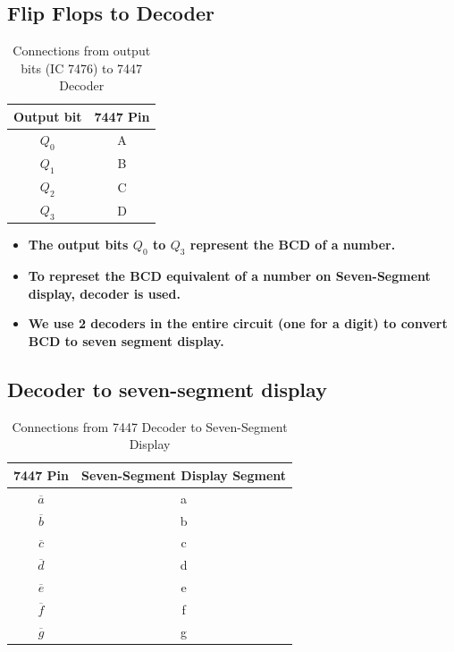 \documentclass[a4paper,12pt]{article}
\begin{document}
\subsection{Flip Flops to Decoder}
\begin{table}[H]
    \centering
    \renewcommand{\arraystretch}{1.3}
    \begin{tabular}{|c|c|}
        \hline
        \textbf{Output bit} & \textbf{7447 Pin} \\
        \hline
        $Q_0$ & A \\
        $Q_1$ & B \\
        $Q_2$ & C \\
        $Q_3$ & D \\
        \hline
    \end{tabular}
    \caption{Connections from output bits (IC 7476) to 7447 Decoder}
    \label{tab:7447_connections}
\end{table}
\begin{itemize}
    \item \textbf{The output bits $Q_0$ to $Q_3$ represent the BCD of a number.}
    \item \textbf{To represet the BCD equivalent of a number on Seven-Segment display, decoder is used.}
    \item \textbf{We use 2 decoders in the entire circuit (one for a digit) to convert BCD to seven segment display.}
\end{itemize}


\subsection{Decoder to seven-segment display}
\begin{table}[H]
    \centering
    \renewcommand{\arraystretch}{1.3}
    \begin{tabular}{|c|c|}
        \hline
        \textbf{7447 Pin} & \textbf{Seven-Segment Display Segment} \\
        \hline
        $\overline{a}$ & a \\
        $\overline{b}$ & b \\
        $\overline{c}$ & c \\
        $\overline{d}$ & d \\
        $\overline{e}$ & e \\
        $\overline{f}$ & f \\
        $\overline{g}$ & g \\
        \hline
    \end{tabular}
    \caption{Connections from 7447 Decoder to Seven-Segment Display}
    \label{tab:7447_connections}
\end{table}
\end{document}
